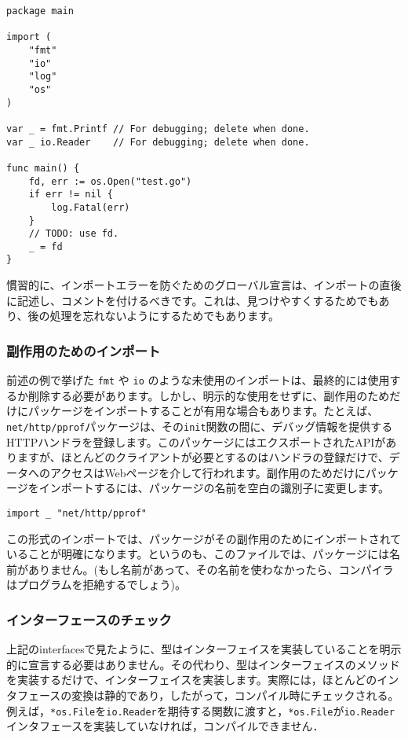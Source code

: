 \documentclass{jsarticle}
\begin{document}
\begin{lstlisting}[numbers=none]
package main

import (
    "fmt"
    "io"
    "log"
    "os"
)

var _ = fmt.Printf // For debugging; delete when done.
var _ io.Reader    // For debugging; delete when done.

func main() {
    fd, err := os.Open("test.go")
    if err != nil {
        log.Fatal(err)
    }
    // TODO: use fd.
    _ = fd
}
\end{lstlisting}

慣習的に、インポートエラーを防ぐためのグローバル宣言は、インポートの直後に記述し、コメントを付けるべきです。これは、見つけやすくするためでもあり、後の処理を忘れないようにするためでもあります。

\subsubsection{副作用のためのインポート}

前述の例で挙げた \texttt{fmt} や \texttt{io}
のような未使用のインポートは、最終的には使用するか削除する必要があります。しかし、明示的な使用をせずに、副作用のためだけにパッケージをインポートすることが有用な場合もあります。たとえば、{\texttt{net/http/pprof}}パッケージは、その\texttt{init}関数の間に、デバッグ情報を提供するHTTPハンドラを登録します。このパッケージにはエクスポートされたAPIがありますが、ほとんどのクライアントが必要とするのはハンドラの登録だけで、データへのアクセスはWebページを介して行われます。副作用のためだけにパッケージをインポートするには、パッケージの名前を空白の識別子に変更します。

\begin{lstlisting}[numbers=none]
import _ "net/http/pprof"
\end{lstlisting}

この形式のインポートでは、パッケージがその副作用のためにインポートされていることが明確になります。というのも、このファイルでは、パッケージには名前がありません。(もし名前があって、その名前を使わなかったら、コンパイラはプログラムを拒絶するでしょう)。

\subsubsection{インターフェースのチェック}

上記の{interfaces}で見たように、型はインターフェイスを実装していることを明示的に宣言する必要はありません。その代わり、型はインターフェイスのメソッドを実装するだけで、インターフェイスを実装します。実際には，ほとんどのインタフェースの変換は静的であり，したがって，コンパイル時にチェックされる。例えば，\texttt{*os.File}を\texttt{io.Reader}を期待する関数に渡すと，\texttt{*os.File}が\texttt{io.Reader}インタフェースを実装していなければ，コンパイルできません．
\end{document}
